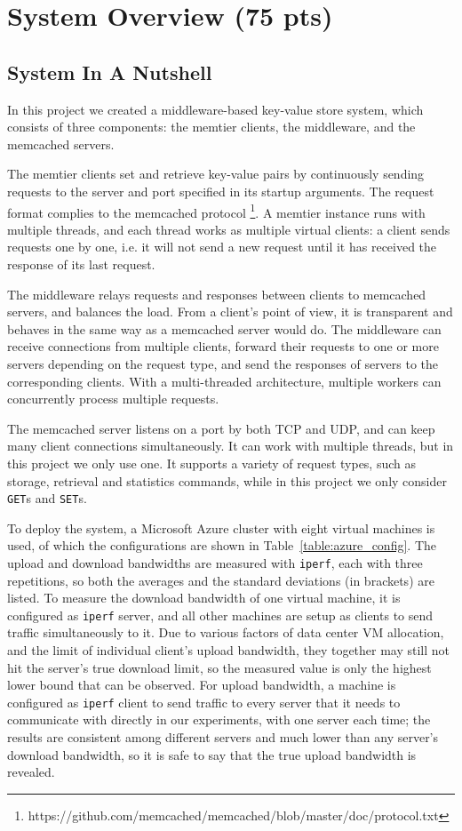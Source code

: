 \section{System Overview (75 pts)}

\subsection{System In A Nutshell}

In this project we created a middleware-based key-value store system, which consists of three components: the memtier clients, the middleware, and the memcached servers.

The memtier clients set and retrieve key-value pairs by continuously sending requests to the server and port specified in its startup arguments. The request format complies to the memcached protocol \footnote{https://github.com/memcached/memcached/blob/master/doc/protocol.txt}. A memtier instance runs with multiple threads, and each thread works as multiple virtual clients: a client sends requests one by one, i.e. it will not send a new request until it has received the response of its last request.

The middleware relays requests and responses between clients to memcached servers, and balances the load. From a client's point of view, it is transparent and behaves in the same way as a memcached server would do. The middleware can receive connections from multiple clients, forward their requests to one or more servers depending on the request type, and send the responses of servers to the corresponding clients. With a multi-threaded architecture, multiple workers can concurrently process multiple requests.

The memcached server listens on a port by both TCP and UDP, and can keep many client connections simultaneously. It can work with multiple threads, but in this project we only use one. It supports a variety of request types, such as storage, retrieval and statistics commands, while in this project we only consider \texttt{GET}s and \texttt{SET}s. 

To deploy the system, a Microsoft Azure cluster with eight virtual machines is used, of which the configurations are shown in Table~\ref{table:azure_config}. The upload and download bandwidths are measured with \texttt{iperf}, each with three repetitions, so both the averages and the standard deviations (in brackets) are listed. To measure the download bandwidth of one virtual machine, it is configured as \texttt{iperf} server, and all other machines are setup as clients to send traffic simultaneously to it. Due to various factors of data center VM allocation, and the limit of individual client's upload bandwidth, they together may still not hit the server's true download limit, so the measured value is only the highest lower bound that can be observed. For upload bandwidth, a machine is configured as \texttt{iperf} client to send traffic to every server that it needs to communicate with directly in our experiments, with one server each time; the results are consistent among different servers and much lower than any server's download bandwidth, so it is safe to say that the true upload bandwidth is revealed.

